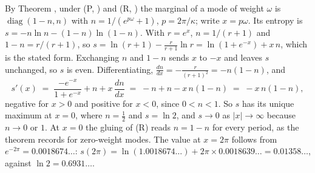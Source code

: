 By Theorem , under (P, ) and (R, ) the marginal of a mode of weight $\omega$ is $\operatorname{diag}(1 - n, n)$ with $n = 1/(e^{p\omega} + 1)$, $p = 2\pi/\kappa$; write $x = p\omega$. Its entropy is $s = -n\ln n - (1 - n)\ln(1 - n)$. With $r = e^{x}$, $n = 1/(r + 1)$ and $1 - n = r/(r + 1)$, so $s = \ln(r + 1) - \frac{r}{r + 1}\ln r = \ln(1 + e^{-x}) + x\,n$, which is the stated form. Exchanging $n$ and $1 - n$ sends $x$ to $-x$ and leaves $s$ unchanged, so $s$ is even. Differentiating, $\frac{dn}{dx} = -\frac{r}{(r + 1)^{2}} = -n(1 - n)$, and
\[
s'(x) \;=\; \frac{-e^{-x}}{1 + e^{-x}} + n + x\,\frac{dn}{dx} \;=\; -n + n - x\,n(1 - n) \;=\; -x\,n(1 - n) ,
\]
negative for $x > 0$ and positive for $x < 0$, since $0 < n < 1$. So $s$ has its unique maximum at $x = 0$, where $n = \tfrac12$ and $s = \ln 2$, and $s \to 0$ as $|x| \to \infty$ because $n \to 0$ or $1$. At $x = 0$ the gluing of (R) reads $n = 1 - n$ for every period, as the theorem records for zero-weight modes. The value at $x = 2\pi$ follows from $e^{-2\pi} = 0.0018674\ldots$: $s(2\pi) = \ln(1.0018674\ldots) + 2\pi \times 0.0018639\ldots = 0.01358\ldots$, against $\ln 2 = 0.6931\ldots$.
